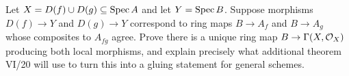 \begin{problem}\label{chal:vi19-c05}
Let $X=D(f)\cup D(g)\subseteq\operatorname{Spec} A$ and let $Y=\operatorname{Spec} B$. Suppose morphisms $D(f)\to Y$ and $D(g)\to Y$ correspond to ring maps $B\to A_f$ and $B\to A_g$ whose composites to $A_{fg}$ agree.  Prove there is a unique ring map $B\to\Gamma(X,\mathcal O_X)$ producing both local morphisms, and explain precisely what additional theorem VI/20 will use to turn this into a gluing statement for general schemes.
\end{problem}

